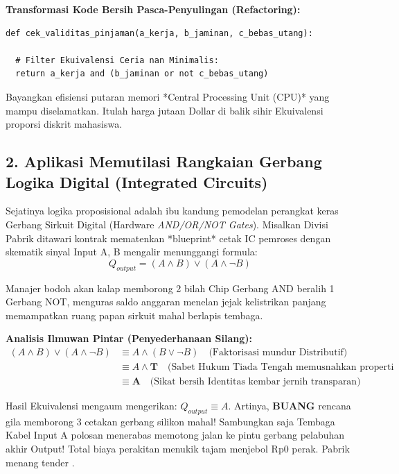 \textbf{Transformasi Kode Bersih Pasca-Penyulingan (Refactoring):}
\begin{lstlisting}[style=pythonstyle]
def cek_validitas_pinjaman(a_kerja, b_jaminan, c_bebas_utang):
  
  # Filter Ekuivalensi Ceria nan Minimalis:
  return a_kerja and (b_jaminan or not c_bebas_utang)
\end{lstlisting}
Bayangkan efisiensi putaran memori *Central Processing Unit (CPU)* yang mampu diselamatkan. Itulah harga jutaan Dollar di balik sihir Ekuivalensi proporsi diskrit mahasiswa.

\subsection{2. Aplikasi Memutilasi Rangkaian Gerbang Logika Digital (Integrated Circuits)}

Sejatinya logika proposisional adalah ibu kandung pemodelan perangkat keras Gerbang Sirkuit Digital (Hardware \textit{AND/OR/NOT Gates}). Misalkan Divisi Pabrik ditawari kontrak mematenkan *blueprint* cetak IC pemroses dengan skematik sinyal Input A, B mengalir menunggangi formula: 
$$ Q_{output} = (A \land B) \lor (A \land \neg B) $$

Manajer bodoh akan kalap memborong 2 bilah Chip Gerbang AND beralih 1 Gerbang NOT, menguras saldo anggaran menelan jejak kelistrikan panjang memampatkan ruang papan sirkuit mahal berlapis tembaga.

\textbf{Analisis Ilmuwan Pintar (Penyederhanaan Silang):}
\begin{align*}
    (A \wedge B) \vee (A \wedge \neg B) &\equiv A \wedge (B \vee \neg B) \quad \text{(Faktorisasi mundur Distributif)} \\
    &\equiv A \wedge \mathbf{T} \quad \text{(Sabet Hukum Tiada Tengah memusnahkan properti biner)} \\
    &\equiv \mathbf{A} \quad \text{(Sikat bersih Identitas kembar jernih transparan)}
\end{align*}

Hasil Ekuivalensi mengaum mengerikan: $Q_{output} \equiv A$.
Artinya, \textbf{BUANG} rencana gila memborong 3 cetakan gerbang silikon mahal! Sambungkan saja Tembaga Kabel Input A polosan menerabas memotong jalan ke pintu gerbang pelabuhan akhir Output! Total biaya perakitan menukik tajam menjebol Rp0 perak. Pabrik menang tender \cite{wiki_first_order_logic}.
